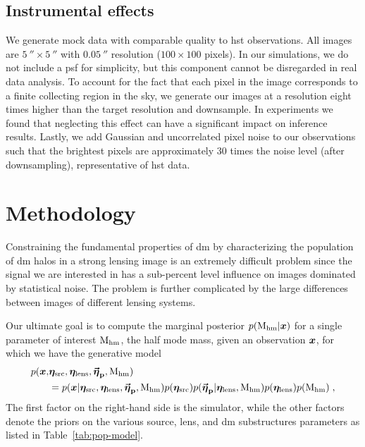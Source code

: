 \subsection{Instrumental effects}

We generate mock data with comparable quality to \gls*{hst} observations. All images are $\SI{5}{\arcsecond} \times \SI{5}{\arcsecond}$ with $\SI{0.05}{\arcsecond}$ resolution ($100 \times 100$ pixels). In our simulations, we do not include a \gls*{psf} for simplicity, but this component cannot be disregarded in real data analysis. To account for the fact that each pixel in the image corresponds to a finite collecting region in the sky, we generate our images at a resolution eight times higher than the target resolution and downsample. In experiments we found that neglecting this effect can have a significant impact on inference results. Lastly, we add Gaussian and uncorrelated pixel noise to our observations such that the brightest pixels are approximately 30 times the noise level (after downsampling), representative of \gls*{hst} data.




\section{Methodology} \label{sec:sl-analysis}

Constraining the fundamental properties of \gls*{dm} by characterizing the population of \gls*{dm} halos in a strong lensing image is an extremely difficult problem since the signal we are interested in has a sub-percent level influence on images dominated by statistical noise. The problem is further complicated by the large differences between images of different lensing systems.

Our ultimate goal is to compute the marginal posterior $p(\mathrm{M_{hm}}|\bm{x})$ for a single parameter of interest $\mathrm{M_{hm}}$, the half mode mass, given an observation $\bm{x}$, for which we have the generative model
\begin{equation}
\label{eq:model}
\begin{split}
    p(\bm{x}, &\bm{\eta}_\mathrm{src}, \bm{\eta}_\mathrm{lens}, \boldsymbol{\vec{{\bm{\eta}}}_\mathrm{p}}, \mathrm{M_{hm}}) \\
    &= p(\bm{x}|\bm{\eta}_\mathrm{src}, \bm{\eta}_\mathrm{lens}, \boldsymbol{\vec{{\bm{\eta}}}_\mathrm{p}}, \mathrm{M_{hm}}) p(\bm{\eta}_\mathrm{src})p(\boldsymbol{\vec{{\bm{\eta}}}_\mathrm{p}}|\bm{\eta}_\mathrm{lens}, \mathrm{M_{hm}}) p(\bm{\eta}_\mathrm{lens}) p(\mathrm{M_{hm}})\; ,
\end{split}
\end{equation}
The first factor on the right-hand side is the simulator, while the other factors denote the priors on the various source, lens, and \gls*{dm} substructures parameters as listed in Table~\ref{tab:pop-model}. 

